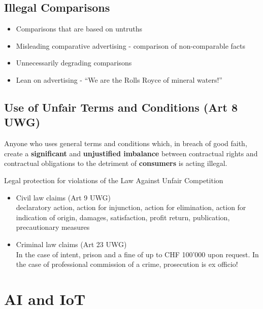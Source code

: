 \documentclass[11pt]{article}
\theoremstyle{definition}
\begin{document}
\subsection{Illegal Comparisons}
\begin{itemize}
	\item Comparisons that are based on untruths
	\item Misleading comparative advertising - comparison of non-comparable facts
	\item Unnecessarily degrading comparisons
	\item Lean on advertising - \textquotedblleft We are the Rolls Royce of mineral waters!\textquotedblright
\end{itemize}

\subsection{Use of Unfair Terms and Conditions (Art 8 UWG)}
\begin{definition}
	Anyone who uses general terms and conditions which, in breach of good faith, create a \textbf{significant} and \textbf{unjustified imbalance} between contractual rights and contractual obligations to the detriment of \textbf{consumers} is acting illegal.
\end{definition}
Legal protection for violations of the Law Against Unfair Competition
\begin{itemize}
	\item Civil law claims (Art 9 UWG)\\
	declaratory action, action for injunction, action for elimination, action for indication of origin, damages, satisfaction, profit return, publication, precautionary measures
	\item Criminal law claims (Art 23 UWG)\\
	In the case of intent, prison and a fine of up to CHF 100'000 upon request. In the case of professional commission of a crime, prosecution is ex officio!
\end{itemize}

\section{AI and IoT}
\end{document}
